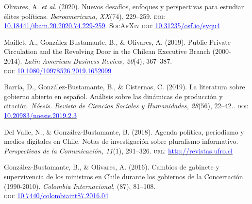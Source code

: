 
\begin{publications}

\begin{benumerate}{7}
\item{\small Olivares, A. {\itshape et al.} (2020). Nuevos desafíos, enfoques y perspectivas para estudiar élites políticas. {\itshape Iberoamericana, XX}(74), 229--259. {\scshape doi}: \href{https://doi.org/10.18441/ibam.20.2020.74.229-259}{\textcolor{blue}{10.18441/ibam.20.2020.74.229-259}}. {\scshape {\footnotesize SocArXiv} doi}: \href{https://doi.org/10.31235/osf.io/syqu4}{\textcolor{blue}{10.31235/osf.io/syqu4}}}\vspace{1mm}

\item{\small Maillet, A., Gonz\'alez-Bustamante, B., \& Olivares, A. (2019). Public-Private Circulation and the Revolving Door in the Chilean Executive Branch (2000-2014). {\itshape Latin American Business Review, 20}(4), 367--387. \\ {\scshape doi}: \href{https://doi.org/10.1080/10978526.2019.1652099}{\textcolor{blue}{10.1080/10978526.2019.1652099}}}\vspace{1mm}

\item{\small Barr\'ia, D., Gonz\'alez-Bustamante, B., \& Cisternas, C. (2019). La literatura sobre gobierno abierto en español. Análisis sobre las dinámicas de producción y citación. {\itshape N\'oesis. Revista de Ciencias Sociales y Humanidades, 28}(56), 22--42.. {\scshape doi}: \href{http://dx.doi.org/10.20983/noesis.2019.2.3}{\textcolor{blue}{10.20983/noesis.2019.2.3}}}\vspace{1mm}

\item{\small Del Valle, N., \& Gonz\'alez-Bustamante, B. (2018). Agenda política, periodismo y medios digitales en Chile. Notas de investigación sobre pluralismo informativo. {\itshape Perspectivas de la Comunicaci\'on, 11}(1), 291--326. {\scshape url}: \href{http://revistas.ufro.cl/ojs/index.php/perspectivas/article/view/1146}{\textcolor{blue}{http://revistas.ufro.cl}}}\vspace{1mm}

\item{\small Gonz\'alez-Bustamante, B., \& Olivares, A. (2016). Cambios de gabinete y supervivencia de los ministros en Chile durante los gobiernos de la Concertación (1990-2010). {\itshape Colombia Internacional}, (87), 81--108. \\ {\scshape doi}: \href{https://doi.org/10.7440/colombiaint87.2016.04}{\textcolor{blue}{10.7440/colombiaint87.2016.04}}}\vspace{1mm}


\end{benumerate}
\end{publications}
